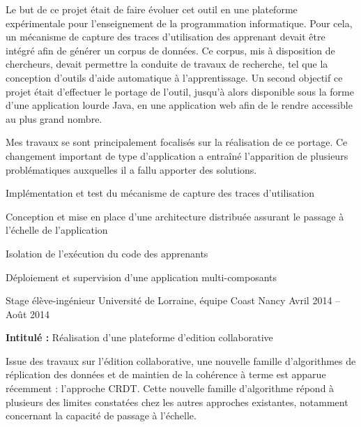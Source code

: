 \documentclass[12pt, a4paper]{awesome-cv}
\begin{document}
\begin{cventries}
\begin{cvparagraph}
    Le but de ce projet était de faire évoluer cet outil en une plateforme expérimentale pour l'enseignement de la programmation informatique.
    Pour cela, un mécanisme de capture des traces d'utilisation des apprenant devait être intégré afin de générer un corpus de données.
    Ce corpus, mis à disposition de chercheurs, devait permettre la conduite de travaux de recherche, tel que la conception d'outils d'aide automatique à l'apprentissage.
    Un second objectif ce projet était d'effectuer le portage de l'outil, jusqu'à alors disponible sous la forme d'une application lourde Java, en une application web afin de le rendre accessible au plus grand nombre.

    Mes travaux se sont principalement focalisés sur la réalisation de ce portage.
    Ce changement important de type d'application a entraîné l'apparition de plusieurs problématiques auxquelles il a fallu apporter des solutions.

    \begin{tightemize}
    \item Implémentation et test du mécanisme de capture des traces d'utilisation
    \item Conception et mise en place d'une architecture distribuée assurant le passage à l'échelle de l'application
    \item Isolation de l'exécution du code des apprenants
    \item Déploiement et supervision d'une application multi-composants
    \end{tightemize}
  \end{cvparagraph}

\cventry
  {Stage élève-ingénieur} %
  {Université de Lorraine, équipe Coast} %
  {Nancy} %
  {Avril 2014 – Août 2014} %
  {
    \begin{cvitems} %
      \item {\textbf{Intitulé :}  Réalisation d’une plateforme d’edition collaborative}
    \end{cvitems}
  }

  \begin{cvparagraph}
    Issue des travaux sur l'édition collaborative, une nouvelle famille d'algorithmes de réplication des données et de maintien de la cohérence à terme est apparue récemment : l'approche \acf{CRDT}.
    Cette nouvelle famille d'algorithme répond à plusieurs des limites constatées chez les autres approches existantes, notamment concernant la capacité de passage à l'échelle.


\end{cvparagraph}
\end{cventries}
\end{document}
